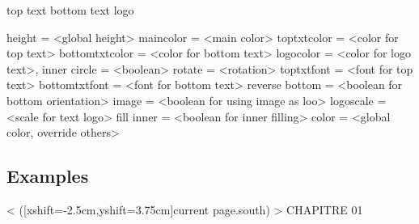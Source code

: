 \documentclass[english,10pt,a4paper]{article}
\begin{document}
\begin{codehigh}[language=latex/latex2]
\pictosmallstamp*%
  [keys]%
  <shift position>
  {top text}
  {bottom text}
  {logo}
\end{codehigh}

\begin{codehigh}[language=latex/latex2]
height          = <global height>
maincolor       = <main color>
toptxtcolor     = <color for top text>
bottomtxtcolor  = <color for bottom text>
logocolor       = <color for logo text>,
inner circle    = <boolean>
rotate          = <rotation>
toptxtfont      = <font for top text>
bottomtxtfont   = <font for bottom text>
reverse bottom  = <boolean for bottom orientation>
image           = <boolean for using image as loo>
logoscale       = <scale for text logo>
fill inner      = <boolean for inner filling>
color           = <global color, override others>
\end{codehigh}

\subsection{Examples}

\begin{demohigh}[language=latex/latex2]
\pictostamp{}%
\end{demohigh}

\begin{demohigh}[language=latex/latex2]
\pictostamp[radius=1.5cm,rotate=0]{}%
\end{demohigh}

\begin{demohigh}[language=latex/latex2]
\end{demohigh}

\begin{demohigh}[language=latex/latex2]
%
\end{demohigh}

\begin{codehigh}[language=latex/latex2]
\pictostamp*%
  [radius=3cm,color=purple,starsfilled,rotate=30]%
  < ([xshift=-2.5cm,yshift=3.75cm]current page.south) >%
  {CHAPITRE 01}%
\end{codehigh}
\end{document}
